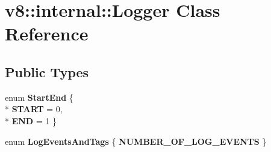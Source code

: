 \hypertarget{classv8_1_1internal_1_1_logger}{}\section{v8\+:\+:internal\+:\+:Logger Class Reference}
\label{classv8_1_1internal_1_1_logger}
\subsection*{Public Types}
\begin{DoxyCompactItemize}
\item 
enum {\bfseries Start\+End} \{ \\*
{\bfseries S\+T\+A\+RT} = 0, 
\\*
{\bfseries E\+ND} = 1
 \}\hypertarget{classv8_1_1internal_1_1_logger_ae1d0584967c39c5e1a33a9d8a16ce1e7}{}\label{classv8_1_1internal_1_1_logger_ae1d0584967c39c5e1a33a9d8a16ce1e7}

\item 
enum {\bfseries Log\+Events\+And\+Tags} \{ {\bfseries N\+U\+M\+B\+E\+R\+\_\+\+O\+F\+\_\+\+L\+O\+G\+\_\+\+E\+V\+E\+N\+TS}
 \}\hypertarget{classv8_1_1internal_1_1_logger_af031bcdf46403d7334622c4c1df6777a}{}\label{classv8_1_1internal_1_1_logger_af031bcdf46403d7334622c4c1df6777a}

\end{DoxyCompactItemize}
